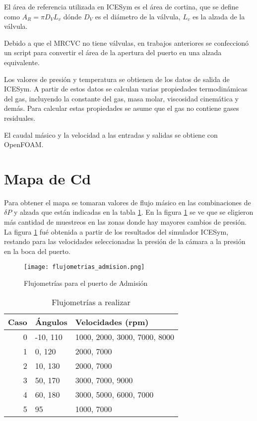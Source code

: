 El área de referencia utilizada en ICESym es el área de cortina, que se define
como $A_{R} = \pi D_{V} L_{{v}}$ dónde $D_{V}$ es el diámetro de la válvula,
$L_{v}$ es la alzada de la válvula.

Debido a que el MRCVC no tiene válvulas, en trabajos anteriores se confeccionó
un script para convertir el área de la apertura del puerto en una alzada
equivalente.

Los valores de presión y temperatura se obtienen de los datos de salida de
ICESym.
%
A partir de estos datos se calculan varias propiedades termodinámicas del gas,
incluyendo la constante del gas, masa molar, viscosidad cinemática y demás.
%
Para calcular estas propiedades se asume que el gas no contiene gases residuales.

El caudal másico y la velocidad a las entradas y salidas se obtiene con
OpenFOAM.



\section{Mapa de Cd}
%
Para obtener el mapa se tomaran valores de flujo másico en las combinaciones de
$\delta P$ y alzada que están indicadas en la tabla \ref{tab:casos}.
%
En la figura \ref{fig:flujometrias} se ve que se eligieron más cantidad de
muestreos en las zonas donde hay mayores cambios de presión.
%
La figura \ref{fig:flujometrias} fué obtenida a partir de los resultados del
simulador ICESym, restando para las velocidades seleccionadas la presión de la
cámara a la presión en la boca del puerto.

\begin{figure}
    \centering
    \texttt{[image: flujometrias\_admision.png]}
    \caption{Flujometrías para el puerto de Admisión}
    \label{fig:flujometrias}
\end{figure}

\begin{table}
    \centering
    \begin{tabular}{rll} \toprule
        Caso & Ángulos & Velocidades (rpm) \\ \midrule
        0 & -10, 110 & 1000, 2000, 3000, 7000, 8000 \\
        1 & 0, 120 & 2000, 7000 \\
        2 & 10, 130 & 2000, 7000 \\
        3 & 50, 170 & 3000, 7000, 9000 \\
        4 & 60, 180 & 3000, 5000, 6000, 7000 \\
        5 & 95 & 1000, 7000\\ \bottomrule
    \end{tabular}
    \caption{Flujometrías a realizar}
    \label{tab:casos}
\end{table}

